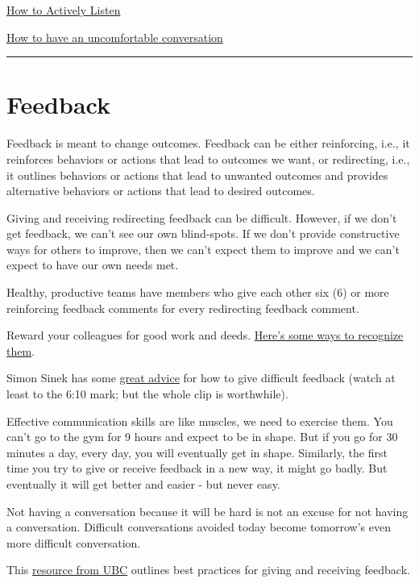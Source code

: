\documentclass[
  letterpaper,
  DIV=11,
  numbers=noendperiod]{scrreprt}
\begin{document}
\href{https://www.youtube.com/watch?v=Lkj86o69c5c}{How to Actively
Listen}

\href{https://www.youtube.com/watch?v=RcGkHrPSzDc}{How to have an
uncomfortable conversation}

\begin{center}\rule{0.5\linewidth}{0.5pt}\end{center}

\section{Feedback}\label{feedback}

Feedback is meant to change outcomes. Feedback can be either
reinforcing, i.e., it reinforces behaviors or actions that lead to
outcomes we want, or redirecting, i.e., it outlines behaviors or actions
that lead to unwanted outcomes and provides alternative behaviors or
actions that lead to desired outcomes.

Giving and receiving redirecting feedback can be difficult. However, if
we don't get feedback, we can't see our own blind-spots. If we don't
provide constructive ways for others to improve, then we can't expect
them to improve and we can't expect to have our own needs met.

Healthy, productive teams have members who give each other six (6) or
more reinforcing feedback comments for every redirecting feedback
comment.

Reward your colleagues for good work and deeds.
\href{https://sites.google.com/noaa.gov/myafsc/home/workforce-collaboration-team-wct}{Here's
some ways to recognize them}.

Simon Sinek has some \href{https://youtu.be/tttv9lRPcLA?t=235}{great
advice} for how to give difficult feedback (watch at least to the 6:10
mark; but the whole clip is worthwhile).

Effective communication skills are like muscles, we need to exercise
them. You can't go to the gym for 9 hours and expect to be in shape. But
if you go for 30 minutes a day, every day, you will eventually get in
shape. Similarly, the first time you try to give or receive feedback in
a new way, it might go badly. But eventually it will get better and
easier - but never easy.

Not having a conversation because it will be hard is not an excuse for
not having a conversation. Difficult conversations avoided today become
tomorrow's even more difficult conversation.

This
\href{https://scwrl.ubc.ca/stem-writing-resources/learning-strategies-for-communicating-science/how-to-give-and-receive-effective-feedback/}{resource
from UBC} outlines best practices for giving and receiving feedback.
\end{document}
